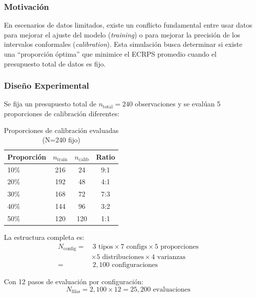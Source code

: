 \subsubsection{Motivación}

En escenarios de datos limitados, existe un conflicto fundamental entre usar datos para mejorar el ajuste del modelo (\textit{training}) o para mejorar la precisión de los intervalos conformales (\textit{calibration}). Esta simulación busca determinar si existe una ``proporción óptima'' que minimice el ECRPS promedio cuando el presupuesto total de datos es fijo.

\subsubsection{Diseño Experimental}

Se fija un presupuesto total de $n_{\text{total}} = 240$ observaciones y se evalúan 5 proporciones de calibración diferentes:

\begin{table}[htbp]
\centering
\caption{Proporciones de calibración evaluadas (N=240 fijo)}
\label{tab:proporciones_calib}
\begin{tabular}{lccc}
\toprule
\textbf{Proporción} & $n_{\text{train}}$ & $n_{\text{calib}}$ & \textbf{Ratio} \\
\midrule
10\% & 216 & 24 & 9:1 \\
20\% & 192 & 48 & 4:1 \\
30\% & 168 & 72 & 7:3 \\
40\% & 144 & 96 & 3:2 \\
50\% & 120 & 120 & 1:1 \\
\bottomrule
\end{tabular}
\end{table}

La estructura completa es:
\begin{equation}
\begin{split}
N_{\text{config}} = & \ 3 \text{ tipos} \times 7 \text{ configs} \times 5 \text{ proporciones} \\
& \times 5 \text{ distribuciones} \times 4 \text{ varianzas} \\
= & \ 2{,}100 \text{ configuraciones}
\end{split}
\end{equation}

Con 12 pasos de evaluación por configuración:
\begin{equation}
N_{\text{filas}} = 2{,}100 \times 12 = 25{,}200 \text{ evaluaciones}
\end{equation}

